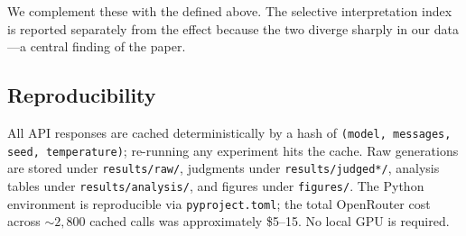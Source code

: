 We complement these with the \sii defined above. The selective interpretation index is reported separately from the \unsat effect because the two diverge sharply in our data---a central finding of the paper.

\subsection{Reproducibility}

All API responses are cached deterministically by a hash of \texttt{(model, messages, seed, temperature)}; re-running any experiment hits the cache. Raw generations are stored under \texttt{results/raw/}, judgments under \texttt{results/judged*/}, analysis tables under \texttt{results/analysis/}, and figures under \texttt{figures/}. The Python environment is reproducible via \texttt{pyproject.toml}; the total OpenRouter cost across $\sim\!2{,}800$ cached calls was approximately \$5--15. No local GPU is required.
